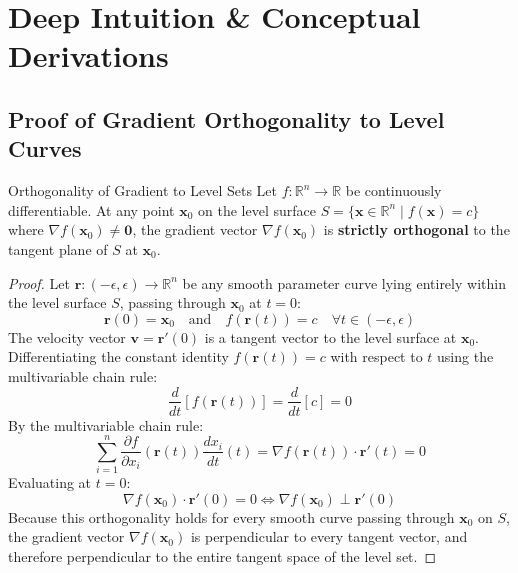 \section{Deep Intuition \& Conceptual Derivations}

\subsection{Proof of Gradient Orthogonality to Level Curves}

\begin{theorembox}{Orthogonality of Gradient to Level Sets}
Let $f: \mathbb{R}^n \to \mathbb{R}$ be continuously differentiable. At any point $\mathbf{x}_0$ on the level surface $S = \{\mathbf{x} \in \mathbb{R}^n \mid f(\mathbf{x}) = c\}$ where $\nabla f(\mathbf{x}_0) \neq \mathbf{0}$, the gradient vector $\nabla f(\mathbf{x}_0)$ is \textbf{strictly orthogonal} to the tangent plane of $S$ at $\mathbf{x}_0$.
\end{theorembox}

\begin{proof}
Let $\mathbf{r}: (-\epsilon, \epsilon) \to \mathbb{R}^n$ be any smooth parameter curve lying entirely within the level surface $S$, passing through $\mathbf{x}_0$ at $t = 0$:
\begin{equation*}
\mathbf{r}(0) = \mathbf{x}_0 \quad \text{and} \quad f(\mathbf{r}(t)) = c \quad \forall t \in (-\epsilon, \epsilon)
\end{equation*}
The velocity vector $\mathbf{v} = \mathbf{r}'(0)$ is a tangent vector to the level surface at $\mathbf{x}_0$.
Differentiating the constant identity $f(\mathbf{r}(t)) = c$ with respect to $t$ using the multivariable chain rule:
\begin{equation*}
\frac{d}{dt} \left[ f(\mathbf{r}(t)) \right] = \frac{d}{dt}[c] = 0
\end{equation*}
By the multivariable chain rule:
\begin{equation*}
\sum_{i=1}^n \frac{\partial f}{\partial x_i}(\mathbf{r}(t)) \frac{dx_i}{dt}(t) = \nabla f(\mathbf{r}(t)) \cdot \mathbf{r}'(t) = 0
\end{equation*}
Evaluating at $t = 0$:
\begin{equation}
\nabla f(\mathbf{x}_0) \cdot \mathbf{r}'(0) = 0 \iff \nabla f(\mathbf{x}_0) \perp \mathbf{r}'(0)
\end{equation}
Because this orthogonality holds for every smooth curve passing through $\mathbf{x}_0$ on $S$, the gradient vector $\nabla f(\mathbf{x}_0)$ is perpendicular to every tangent vector, and therefore perpendicular to the entire tangent space of the level set.
\end{proof}

